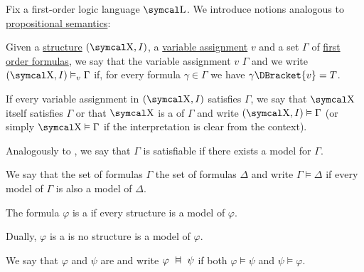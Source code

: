 \begin{definition}\label{def:first_order_semantics}
  Fix a first-order logic language \( \CL \). We introduce notions analogous to \hyperref[def:propositional_semantics]{propositional semantics}:
  \begin{DefEnum}
     Given a \hyperref[def:first_order_structure]{structure} \( (\CX, I) \), a \hyperref[def:first_order_valuation/variable_assignment]{variable assignment} \( v \) and a set \( \Gamma \) of \hyperref[def:first_order_syntax/formula]{first order formulas}, we say that the variable assignment \( v \)  \( \Gamma \) and we write \( (\CX, I) \vDash_v \Gamma \) if, for every formula \( \gamma \in \Gamma \) we have \( \gamma\DBracket{v} = T \).

    If every variable assignment in \( (\CX, I) \) satisfies \( \Gamma \), we say that \( \CX \) itself satisfies \( \Gamma \) or that \( \CX \) is a  of \( \Gamma \) and write \( (\CX, I) \vDash \Gamma \) (or simply \( \CX \vDash \Gamma \) if the interpretation is clear from the context).

    Analogously to , we say that \( \Gamma \) is satisfiable if there exists a model for \( \Gamma \).

     We say that the set of formulas \( \Gamma \)  the set of formulas \( \Delta \) and write \( \Gamma \vDash \Delta \) if every model of \( \Gamma \) is also a model of \( \Delta \).

     The formula \( \varphi \) is a  if every structure is a model of \( \varphi \).

     Dually, \( \varphi \) is a  is no structure is a model of \( \varphi \).

     We say that \( \varphi \) and \( \psi \) are  and write \( \varphi \Sequiv \psi \) if both \( \varphi \vDash \psi \) and \( \psi \vDash \varphi \).
  \end{DefEnum}
\end{definition}

